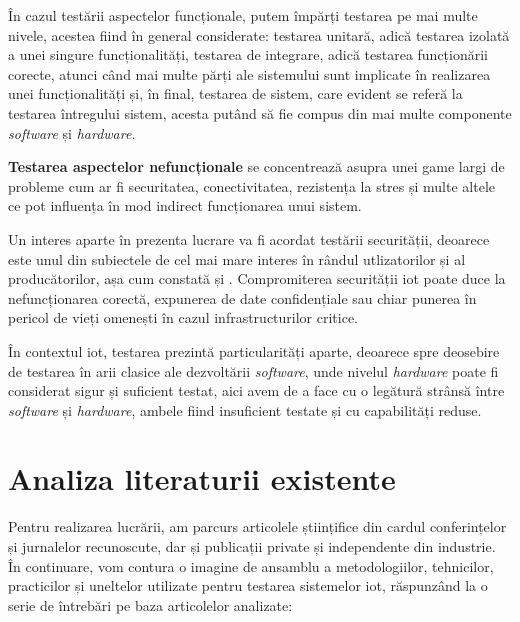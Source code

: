 În cazul testării aspectelor funcționale, putem împărți testarea pe mai multe nivele, acestea fiind în general considerate: testarea unitară, adică testarea izolată a unei singure funcționalități, testarea de integrare, adică testarea funcționării corecte, atunci când mai multe părți ale sistemului sunt implicate în realizarea unei funcționalități și, în final, testarea de sistem, care evident se referă la testarea întregului sistem, acesta putând să fie compus din mai multe componente \textit{software} și \textit{hardware}.

\textbf{Testarea aspectelor nefuncționale} se concentrează asupra unei game largi de probleme cum ar fi securitatea, conectivitatea, rezistența la stres și multe altele ce pot influența în mod indirect funcționarea unui sistem.


Un interes aparte în prezenta lucrare va fi acordat testării securității, deoarece este unul din subiectele de cel mai mare interes în rândul utlizatorilor și al producătorilor, așa cum constată \citet{Ahmed2019} și \citet{Lee2015}. Compromiterea securității \acrshort{iot} poate duce la nefuncționarea corectă, expunerea de date confidențiale sau chiar punerea în pericol de vieți omenești în cazul infrastructurilor critice.


În contextul \acrshort{iot}, testarea prezintă particularități aparte, deoarece spre deosebire de testarea în arii clasice ale dezvoltării \textit{software}, unde nivelul \textit{hardware} poate fi considerat sigur și suficient testat, aici avem de a face cu o legătură strânsă între \textit{software} și \textit{hardware}, ambele fiind insuficient testate și cu capabilități reduse.


\section{Analiza literaturii existente}

Pentru realizarea lucrării, am parcurs articolele științifice din cardul conferințelor și jurnalelor recunoscute, dar și publicații private și independente din industrie. În continuare, vom contura o imagine de ansamblu a metodologiilor, tehnicilor, practicilor și uneltelor utilizate pentru testarea sistemelor \acrshort{iot}, răspunzând la o serie de întrebări pe baza articolelor analizate: 

